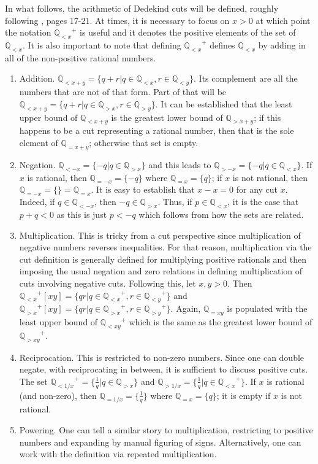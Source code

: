 \documentclass[12pt]{article}
\newcommand{\qcut}[2][x]{\ensuremath{\mathbb{Q}_{#2 #1}}}
\newcommand{\qlt}[1][x]{\qcut[#1]{<}}
\newcommand{\qeq}[1][x]{\qcut[#1]{=}}
\newcommand{\qgt}[1][x]{\qcut[#1]{>}}
\begin{document}
In what follows, the arithmetic of Dedekind cuts will be defined, roughly following \cite{rudin}, pages 17-21.  At times, it is necessary to focus on $x > 0$ at which point the notation $\qlt^+$ is useful and it denotes the positive elements of the set of $\qlt$. It is also important to note that defining $\qlt^+$ defines $\qlt$ by adding in all of the non-positive rational numbers.
 
\begin{enumerate}
    \item Addition. $\qlt[x+y] = \{q + r | q \in \qlt, r \in \qlt[y]\} $. Its complement are all the numbers that are not of that form. Part of that will be $\qlt[x+y] = \{q + r | q \in \qgt, r \in \qgt[y]\}$. It can be established that the least upper bound of $\qlt[x+y]$ is the greatest lower bound of $\qgt[x+y]$; if this happens to be a cut representing a rational number, then that is the sole element of $\qeq[x+y]$; otherwise that set is empty. 
    \item Negation. $\qlt[-x] = \{-q | q \in \qgt\}$ and this leads to $\qgt[-x] = \{-q | q \in \qlt\}$. If $x$ is rational, then $\qeq[-x] = \{-q\}$ where $\qeq = \{q\}$; if $x$ is not rational, then $\qeq[-x] = \{\} = \qeq$. It is easy to establish that $x-x = 0$ for any cut $x$. Indeed, if $q \in \qlt[-x]$, then $-q \in \qgt$. Thus, if $p \in \qlt$, it is the case that $p+q < 0$ as this is just $p < -q$ which follows from how the sets are related. 
    \item Multiplication. This is tricky from a cut perspective since multiplication of negative numbers reverses inequalities. For that reason, multiplication via the cut definition is generally defined for multiplying positive rationals and then imposing the usual negation and zero relations in defining multiplication of cuts involving negative cuts. Following this, let $x , y > 0$. Then $\qlt^+[xy] = \{qr | q \in \qlt^+, r \in \qlt[y]^+ \}$ and $\qgt^+[xy] = \{qr | q \in \qgt^+,  r \in \qgt[y]^+ \}$. Again, $\qeq[xy]$ is populated with the least upper bound of $\qlt[xy]^+$ which is the same as the greatest lower bound of $\qgt[xy]^+$. 
    \item Reciprocation. This is restricted to non-zero numbers. Since one can double negate, with reciprocating in between, it is sufficient to discuss positive cuts.  The set $\qlt[1/x]^+ = \{\frac{1}{q} | q \in \qgt\}$ and $\qgt[1/x] = \{ \frac{1}{q} | q \in \qlt^+ \}$. If $x$ is rational (and non-zero), then $\qeq[1/x] = \{\frac{1}{q}\}$ where $\qeq = \{q\}$; it is empty if $x$ is not rational. 
    \item Powering. One can tell a similar story to multiplication, restricting to positive numbers and expanding by manual figuring of signs. Alternatively, one can work with the definition via repeated multiplication. 
\end{enumerate}
\end{document}
